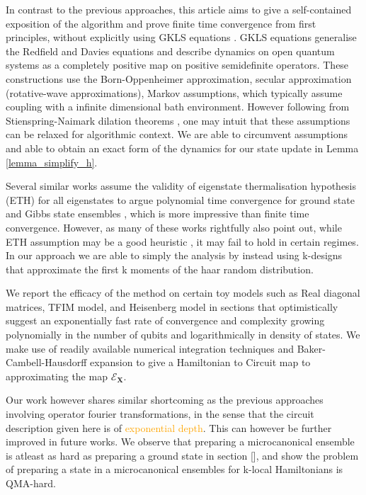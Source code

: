 \documentclass[10pt]{amsart}
\newcommand{\E}{\mathcal{E}}
\newcommand{\X}{\textbf{X}}
\begin{document}
In contrast to the previous approaches, this article aims to give a self-contained exposition of the algorithm and prove finite time convergence from first principles, without explicitly using GKLS equations \cite{}. GKLS equations generalise the Redfield and Davies equations and describe dynamics on open quantum systems as a completely positive map on positive semidefinite operators. These constructions use the Born-Oppenheimer approximation, secular approximation (rotative-wave approximations), Markov assumptions, which typically assume coupling with a infinite dimensional bath environment. However following from Stienspring-Naimark dilation theorems \cite{}, one may intuit that these assumptions can be relaxed for algorithmic context. We are able to circumvent assumptions and able to obtain an exact form of the dynamics for our state update in Lemma \ref{lemma_simplify_h}. 

Several similar works assume the validity of  eigenstate thermalisation hypothesis (ETH) for all eigenstates \cite{} to argue polynomial time convergence for ground state and Gibbs state ensembles \cite{}, which is more impressive than finite time convergence. However, as many of these works rightfully also point out, while ETH assumption may be a good heuristic \cite{}, it may fail to hold in certain regimes.  In our approach we are able to simply the analysis by instead using k-designs that approximate the first k moments of the haar random distribution. 


We report the efficacy of the method on certain toy models such as Real diagonal matrices, TFIM model, and Heisenberg model in sections \cite{} that optimistically suggest an exponentially fast rate of convergence and complexity growing polynomially in the number of qubits and logarithmically in density of states. We make use of readily available numerical integration techniques and Baker-Cambell-Hausdorff expansion to give a Hamiltonian to Circuit map to approximating the map $\E_\X$.  

Our work however shares similar shortcoming as the previous approaches involving operator fourier transformations, in the sense that the circuit description given here is of \textcolor{orange}{exponential depth}. This can however be further improved in future works. We observe that preparing a microcanonical ensemble is atleast as hard as preparing a ground state in section [], and show the problem of preparing a state in a microcanonical ensembles for k-local Hamiltonians is QMA-hard. 
\end{document}
